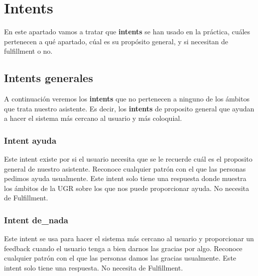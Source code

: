 \section{Intents}

\vspace{5 mm}

En este apartado vamos a tratar que \textbf{intents} se han usado en la práctica, cuáles pertenecen a qué apartado, cúal es su propósito general, y si necesitan de fulfillment o no.

\vspace{5 mm}

\subsection{Intents generales}

\vspace{5 mm}

A continuación veremos los \textbf{intents} que no pertenecen a ninguno de los ámbitos que trata nuestro asistente. Es decir, los \textbf{intents} de proposito general que ayudan a hacer el sistema más cercano al usuario y más coloquial.

\vspace{5 mm}

\subsubsection{Intent ayuda}

\vspace{5 mm}

Este intent existe por si el usuario necesita que se le recuerde cuál es el proposito general de nuestro asistente. Reconoce cualquier patrón con el que las personas pedimos ayuda usualmente. Este intent solo tiene una respuesta donde muestra los ámbitos de la UGR sobre los que nos puede proporcionar ayuda. No necesita de Fulfillment.

\vspace{5 mm}

\subsubsection{Intent de_nada}

\vspace{5 mm}

Este intent se usa para hacer el sistema más cercano al usuario y proporcionar un feedback cuando el usuario tenga a bien darnos las gracias por algo. Reconoce cualquier patrón con el que las personas damos las gracias usualmente. Este intent solo tiene una respuesta. No necesita de Fulfillment.

